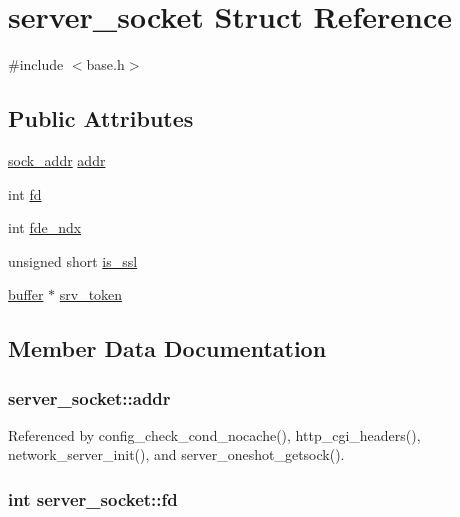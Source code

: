 \hypertarget{structserver__socket}{\section{server\-\_\-socket Struct Reference}
\label{structserver__socket}
}


{\ttfamily \#include $<$base.\-h$>$}

\subsection*{Public Attributes}
\begin{DoxyCompactItemize}
\item 
\hyperlink{unionsock__addr}{sock\-\_\-addr} \hyperlink{structserver__socket_aeb0c2aaf7084b2731b0735660f48b11f}{addr}
\item 
int \hyperlink{structserver__socket_a30382f57e0e544baac6491aa54cfd3e1}{fd}
\item 
int \hyperlink{structserver__socket_ac2a4c92cdb399017e2e4ae6847975a2e}{fde\-\_\-ndx}
\item 
unsigned short \hyperlink{structserver__socket_a84b0aea1a3f4801bfb2d017e7e608e0e}{is\-\_\-ssl}
\item 
\hyperlink{structbuffer}{buffer} $\ast$ \hyperlink{structserver__socket_a39a8f89f90488013461f207dc3e86138}{srv\-\_\-token}
\end{DoxyCompactItemize}


\subsection{Member Data Documentation}
\hypertarget{structserver__socket_aeb0c2aaf7084b2731b0735660f48b11f}{
\subsubsection[{addr}]{ server\-\_\-socket\-::addr}}\label{structserver__socket_aeb0c2aaf7084b2731b0735660f48b11f}


Referenced by config\-\_\-check\-\_\-cond\-\_\-nocache(), http\-\_\-cgi\-\_\-headers(), network\-\_\-server\-\_\-init(), and server\-\_\-oneshot\-\_\-getsock().

\hypertarget{structserver__socket_a30382f57e0e544baac6491aa54cfd3e1}{
\subsubsection[{fd}]{\setlength{\rightskip}{0pt plus 5cm}int server\-\_\-socket\-::fd}}\label{structserver__socket_a30382f57e0e544baac6491aa54cfd3e1}


